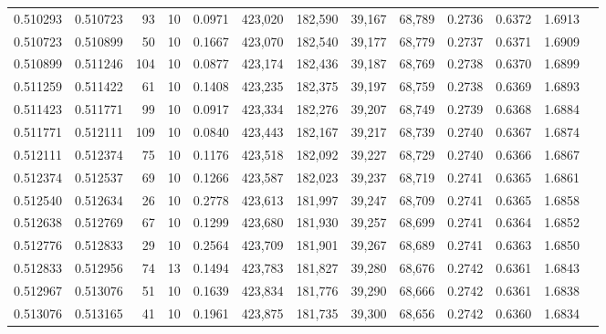 \begin{tabular}{rrrrrrrrrrrrr}
0.510293 & 0.510723 &    93 &  10 &                                     0.0971 & 423,020 & 182,590 &  39,167 &  68,789 & 0.2736 & 0.6372 & 1.6913 \\
0.510723 & 0.510899 &    50 &  10 &                                     0.1667 & 423,070 & 182,540 &  39,177 &  68,779 & 0.2737 & 0.6371 & 1.6909 \\
0.510899 & 0.511246 &   104 &  10 &                                     0.0877 & 423,174 & 182,436 &  39,187 &  68,769 & 0.2738 & 0.6370 & 1.6899 \\
0.511259 & 0.511422 &    61 &  10 &                                     0.1408 & 423,235 & 182,375 &  39,197 &  68,759 & 0.2738 & 0.6369 & 1.6893 \\
0.511423 & 0.511771 &    99 &  10 &                                     0.0917 & 423,334 & 182,276 &  39,207 &  68,749 & 0.2739 & 0.6368 & 1.6884 \\
0.511771 & 0.512111 &   109 &  10 &                                     0.0840 & 423,443 & 182,167 &  39,217 &  68,739 & 0.2740 & 0.6367 & 1.6874 \\
0.512111 & 0.512374 &    75 &  10 &                                     0.1176 & 423,518 & 182,092 &  39,227 &  68,729 & 0.2740 & 0.6366 & 1.6867 \\
0.512374 & 0.512537 &    69 &  10 &                                     0.1266 & 423,587 & 182,023 &  39,237 &  68,719 & 0.2741 & 0.6365 & 1.6861 \\
0.512540 & 0.512634 &    26 &  10 &                                     0.2778 & 423,613 & 181,997 &  39,247 &  68,709 & 0.2741 & 0.6365 & 1.6858 \\
0.512638 & 0.512769 &    67 &  10 &                                     0.1299 & 423,680 & 181,930 &  39,257 &  68,699 & 0.2741 & 0.6364 & 1.6852 \\
0.512776 & 0.512833 &    29 &  10 &                                     0.2564 & 423,709 & 181,901 &  39,267 &  68,689 & 0.2741 & 0.6363 & 1.6850 \\
0.512833 & 0.512956 &    74 &  13 &                                     0.1494 & 423,783 & 181,827 &  39,280 &  68,676 & 0.2742 & 0.6361 & 1.6843 \\
0.512967 & 0.513076 &    51 &  10 &                                     0.1639 & 423,834 & 181,776 &  39,290 &  68,666 & 0.2742 & 0.6361 & 1.6838 \\
0.513076 & 0.513165 &    41 &  10 &                                     0.1961 & 423,875 & 181,735 &  39,300 &  68,656 & 0.2742 & 0.6360 & 1.6834 \\

\end{tabular}

